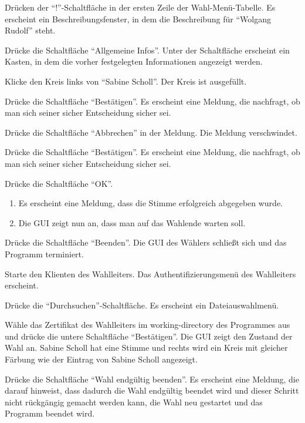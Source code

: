 \documentclass[parskip=full]{scrartcl}
\begin{document}
\teststep{}
		{Drücken der \enquote{!}-Schaltfläche in der ersten Zeile der Wahl-Menü-Tabelle.}
		{Es erscheint ein Beschreibungsfenster, in dem die Beschreibung für \enquote{Wolgang Rudolf} steht.}

\teststep{}
		{Drücke die Schaltfläche \enquote{Allgemeine Infos}.}
		{Unter der Schaltfläche erscheint ein Kasten, in dem die vorher festgelegten Informationen angezeigt werden.}

\teststep{}
		{Klicke den Kreis links von \enquote{Sabine Scholl}.}
		{Der Kreis ist ausgefüllt.}
	
\teststep{}
		{Drücke die Schaltfläche \enquote{Bestätigen}.}
		{Es erscheint eine Meldung, die nachfragt, ob man sich seiner sicher Entscheidung sicher sei.}

\teststep{}
		{Drücke die Schaltfläche \enquote{Abbrechen} in der Meldung.}
		{Die Meldung verschwindet.}
			

\teststep{}
		{Drücke die Schaltfläche \enquote{Bestätigen}.}
		{Es erscheint eine Meldung, die nachfragt, ob man sich seiner sicher Entscheidung sicher sei.}

\teststep{}
		{Drücke die Schaltfläche \enquote{OK}.}
		{\begin{enumerate}
			\item Es erscheint eine Meldung, dass die Stimme erfolgreich abgegeben wurde.
			\item Die GUI zeigt nun an, dass man auf das Wahlende warten soll.
		\end{enumerate}}

\teststep{}
		{Drücke die Schaltfläche \enquote{Beenden}.}
		{Die GUI des Wählers schließt sich und das Programm terminiert.}

\teststep{}
		{Starte den Klienten des Wahlleiters.}
		{Das Authentifizierungsmenü des Wahlleiters erscheint.}

\teststep{}
		{Drücke die \enquote{Durchsuchen}-Schaltfläche.}
		{Es erscheint ein Dateiauswahlmenü.}

\teststep{}
		{Wähle das Zertifikat des Wahlleiters im working-directory des Programmes aus und drücke die untere Schaltfläche \enquote{Bestätigen}.}
		{Die GUI zeigt den Zustand der Wahl an. Sabine Scholl hat eine Stimme und rechts wird ein Kreis mit gleicher Färbung wie der Eintrag von Sabine Scholl angezeigt.}
	
\teststep{}
		{Drücke die Schaltfläche \enquote{Wahl endgültig beenden}.}
		{Es erscheint eine Meldung, die darauf hinweist, dass dadurch die Wahl endgültig beendet wird und dieser Schritt nicht rückgängig gemacht werden kann, die Wahl neu gestartet und das Programm beendet wird.}
		
\end{document}
